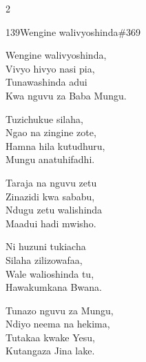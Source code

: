 \begin{multicols}{2}
\begin{hymn}{139}{Wengine walivyoshinda}{\#369}
\begin{stanza}
Wengine walivyoshinda,\\
Vivyo hivyo nasi pia,\\
Tunawashinda adui\\
Kwa nguvu za Baba Mungu.
\end{stanza}
\begin{stanza}
Tuzichukue silaha,\\
Ngao na zingine zote,\\
Hamna hila kutudhuru,\\
Mungu anatuhifadhi.
\end{stanza}
\begin{stanza}
Taraja na nguvu zetu\\
Zinazidi kwa sababu,\\
Ndugu zetu walishinda\\
Maadui hadi mwisho.
\end{stanza}
\begin{stanza}
Ni huzuni tukiacha\\
Silaha zilizowafaa,\\
Wale walioshinda tu,\\
Hawakumkana Bwana.
\end{stanza}
\begin{stanza}
Tunazo nguvu za Mungu,\\
Ndiyo neema na hekima,\\
Tutakaa kwake Yesu,\\
Kutangaza Jina lake.
\end{stanza}
\end{hymn}


\end{multicols}
